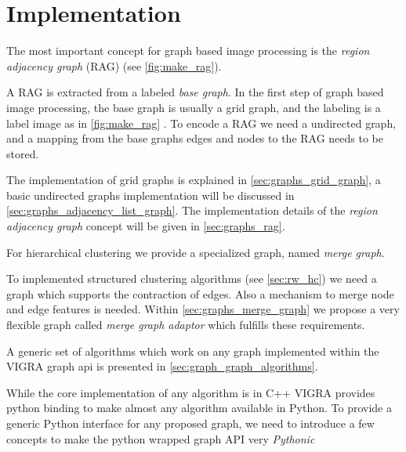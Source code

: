 

\section{Implementation}\label{sec:vigra_graph_lib_impl}


The most important concept for graph based image processing
is the \emph{region adjacency graph} (RAG) (see \cref{fig:make_rag}).

A RAG is extracted from a labeled \emph{base graph}.
In the first step of graph based image processing, the base 
graph is usually a grid graph, and the labeling is a label image
as in \cref{fig:make_rag} .
To encode a RAG we need a undirected graph, 
and a mapping from the base graphs edges and nodes to the RAG 
needs to be stored.

The implementation of grid graphs is explained in \cref{sec:graphs_grid_graph}, 
a basic undirected graphs implementation will be discussed in \cref{sec:graphs_adjacency_list_graph}.
The implementation details of the \emph{region adjacency graph} concept will 
be given in  \cref{sec:graphs_rag}.

For hierarchical clustering we provide a specialized graph, named \emph{merge graph}.


To implemented structured clustering algorithms (see \cref{sec:rw_hc}) we
need a graph which supports the contraction of edges.
Also a mechanism to merge node and edge features is needed.
Within \cref{sec:graphs_merge_graph} we propose  a very flexible graph 
called \emph{merge graph adaptor} which fulfills these requirements.


A generic set of algorithms which work on any graph
implemented within the VIGRA graph api is presented 
in \cref{sec:graph_graph_algorithms}.

While the core implementation of any algorithm is in C++
VIGRA provides python binding to make almost
any algorithm available in Python.
To provide a generic Python interface for any proposed
graph, we need to introduce a few concepts 
to make the python wrapped graph API very \emph{Pythonic}




